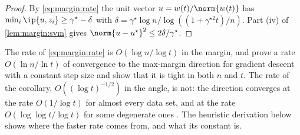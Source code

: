 \begin{refsection}
\begin{proof}
By \eqref{eq:margin:rate} the unit vector $u=w(t)/\norm{w(t)}$ has $\min_i\ip{u,z_i}\ge\gamma^\star-\delta$ with $\delta=\gamma^\star\log n/\log((1+\gamma^{\star2}t)/n)$. Part (iv) of \cref{lem:margin:svm} gives $\norm{u-\marginu}^2\le2\delta/\gamma^\star$.
\end{proof}

The rate of \eqref{eq:margin:rate} is $O(\log n/\log t)$ in the margin, and \textcite{JiTelgarsky2021} prove a rate $O(\ln n/\ln t)$ of convergence to the max-margin direction for gradient descent with a constant step size and show that it is tight in both $n$ and $t$. The rate of the corollary, $O((\log t)^{-1/2})$ in the angle, is not: the direction converges at the rate $O(1/\log t)$ for almost every data set, and at the rate $O(\log\log t/\log t)$ for some degenerate ones \parencite{SoudryEtAl2018}. The heuristic derivation below shows where the faster rate comes from, and what its constant is.


\end{refsection}
